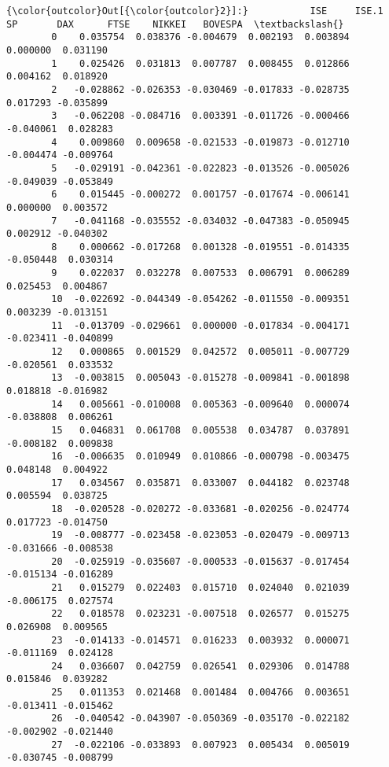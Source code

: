 \documentclass[11pt]{article}
\begin{document}
\begin{Verbatim}[commandchars=\\\{\}]
{\color{outcolor}Out[{\color{outcolor}2}]:}           ISE     ISE.1        SP       DAX      FTSE    NIKKEI   BOVESPA  \textbackslash{}
        0    0.035754  0.038376 -0.004679  0.002193  0.003894  0.000000  0.031190   
        1    0.025426  0.031813  0.007787  0.008455  0.012866  0.004162  0.018920   
        2   -0.028862 -0.026353 -0.030469 -0.017833 -0.028735  0.017293 -0.035899   
        3   -0.062208 -0.084716  0.003391 -0.011726 -0.000466 -0.040061  0.028283   
        4    0.009860  0.009658 -0.021533 -0.019873 -0.012710 -0.004474 -0.009764   
        5   -0.029191 -0.042361 -0.022823 -0.013526 -0.005026 -0.049039 -0.053849   
        6    0.015445 -0.000272  0.001757 -0.017674 -0.006141  0.000000  0.003572   
        7   -0.041168 -0.035552 -0.034032 -0.047383 -0.050945  0.002912 -0.040302   
        8    0.000662 -0.017268  0.001328 -0.019551 -0.014335 -0.050448  0.030314   
        9    0.022037  0.032278  0.007533  0.006791  0.006289  0.025453  0.004867   
        10  -0.022692 -0.044349 -0.054262 -0.011550 -0.009351  0.003239 -0.013151   
        11  -0.013709 -0.029661  0.000000 -0.017834 -0.004171 -0.023411 -0.040899   
        12   0.000865  0.001529  0.042572  0.005011 -0.007729 -0.020561  0.033532   
        13  -0.003815  0.005043 -0.015278 -0.009841 -0.001898  0.018818 -0.016982   
        14   0.005661 -0.010008  0.005363 -0.009640  0.000074 -0.038808  0.006261   
        15   0.046831  0.061708  0.005538  0.034787  0.037891 -0.008182  0.009838   
        16  -0.006635  0.010949  0.010866 -0.000798 -0.003475  0.048148  0.004922   
        17   0.034567  0.035871  0.033007  0.044182  0.023748  0.005594  0.038725   
        18  -0.020528 -0.020272 -0.033681 -0.020256 -0.024774  0.017723 -0.014750   
        19  -0.008777 -0.023458 -0.023053 -0.020479 -0.009713 -0.031666 -0.008538   
        20  -0.025919 -0.035607 -0.000533 -0.015637 -0.017454 -0.015134 -0.016289   
        21   0.015279  0.022403  0.015710  0.024040  0.021039 -0.006175  0.027574   
        22   0.018578  0.023231 -0.007518  0.026577  0.015275  0.026908  0.009565   
        23  -0.014133 -0.014571  0.016233  0.003932  0.000071 -0.011169  0.024128   
        24   0.036607  0.042759  0.026541  0.029306  0.014788  0.015846  0.039282   
        25   0.011353  0.021468  0.001484  0.004766  0.003651 -0.013411 -0.015462   
        26  -0.040542 -0.043907 -0.050369 -0.035170 -0.022182 -0.002902 -0.021440   
        27  -0.022106 -0.033893  0.007923  0.005434  0.005019 -0.030745 -0.008799   

\end{Verbatim}
\end{document}
